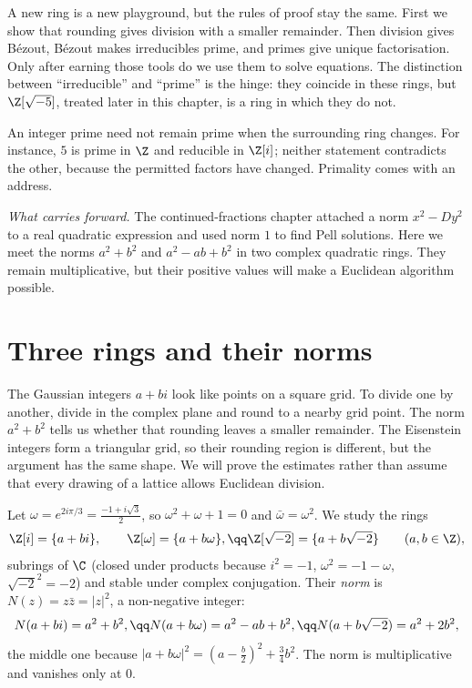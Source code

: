 \begin{reminder}
A new ring is a new playground, but the rules of proof stay the same. First we
show that rounding gives division with a smaller remainder. Then division gives
B\'ezout, B\'ezout makes irreducibles prime, and primes give unique factorisation.
Only after earning those tools do we use them to solve equations. The distinction
between ``irreducible'' and ``prime'' is the hinge: they coincide in these rings,
but $\Z[\sqrt{-5}]$, treated later in this chapter, is a ring in which they do not.
\end{reminder}

An integer prime need not remain prime when the surrounding ring changes.
For instance, $5$ is prime in $\Z$ and reducible in $\Z[i]$; neither statement
contradicts the other, because the permitted factors have changed. Primality
comes with an address.

\noindent\emph{What carries forward.} The continued-fractions chapter attached a norm $x^2-Dy^2$ to a real quadratic expression and used norm $1$ to find Pell solutions. Here we meet the norms $a^2+b^2$ and $a^2-ab+b^2$ in two complex quadratic rings. They remain multiplicative, but their positive values will make a Euclidean algorithm possible.

\section{Three rings and their norms}

The Gaussian integers $a+bi$ look like points on a square grid. To divide one by another, divide in the complex plane and round to a nearby grid point. The norm $a^2+b^2$ tells us whether that rounding leaves a smaller remainder. The Eisenstein integers form a triangular grid, so their rounding region is different, but the argument has the same shape. We will prove the estimates rather than assume that every drawing of a lattice allows Euclidean division.

Let $\omega=e^{2i\pi/3}=\frac{-1+i\sqrt3}2$, so $\omega^2+\omega+1=0$ and $\bar\omega=\omega^2$. We study the rings
\[
\begin{gathered}\Z[i]=\{a+bi\},\qquad\Z[\omega]=\{a+b\omega\},\qq\Z[\sqrt{-2}]=\{a+b\sqrt{-2}\}\qquad(a,b\in\Z),\end{gathered}
\]
subrings of $\C$ (closed under products because $i^2=-1$, $\omega^2=-1-\omega$, $\sqrt{-2}^2=-2$) and stable under complex conjugation. Their \emph{norm} is $N(z)=z\bar z=|z|^2$, a non-negative integer:
\[
\begin{gathered}N(a+bi)=a^2+b^2,\qq N(a+b\omega)=a^2-ab+b^2,\qq N(a+b\sqrt{-2})=a^2+2b^2,\end{gathered}
\]
the middle one because $|a+b\omega|^2=\left(a-\frac b2\right)^2+\frac34b^2$. The norm is multiplicative and vanishes only at $0$.


